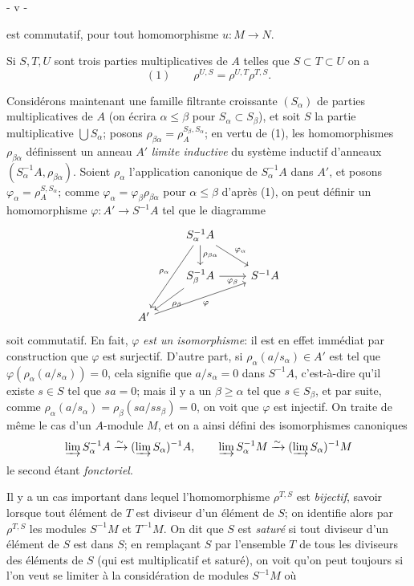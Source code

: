 \begin{center}
- v -
\end{center}

est commutatif, pour tout homomorphisme $u : M \to N$.

Si $S, T, U$ sont trois parties multiplicatives de $A$ telles que $S \subset T \subset U$ on a
$$ (1) \qquad \rho^{U,S} = \rho^{U,T} \rho^{T,S} . $$

Considérons maintenant une famille filtrante croissante $(S_\alpha)$ de parties multiplicatives de $A$ (on écrira $\alpha \leq \beta$ pour $S_\alpha \subset S_\beta$), et soit $S$ la partie multiplicative $\bigcup S_\alpha$; posons $\rho_{\beta\alpha} = \rho_A^{S_\beta, S_\alpha}$; en vertu de (1), les homomorphismes $\rho_{\beta\alpha}$ définissent un anneau $A'$ \emph{limite inductive} du système inductif d'anneaux $(S_\alpha^{-1}A, \rho_{\beta\alpha})$. Soient $\rho_\alpha$ l'application canonique de $S_\alpha^{-1}A$ dans $A'$, et posons $\varphi_\alpha = \rho_A^{S, S_\alpha}$; comme $\varphi_\alpha = \varphi_\beta \rho_{\beta\alpha}$ pour $\alpha \leq \beta$ d'après (1), on peut définir un homomorphisme $\varphi : A' \to S^{-1}A$ tel que le diagramme
$$
\begin{tikzcd}
& S_\alpha^{-1}A \arrow[d, "\rho_{\beta\alpha}"] \arrow[dr, "\varphi_\alpha"] \arrow[ddl, "\rho_\alpha"'] & \\
& S_\beta^{-1}A \arrow[dl, "\rho_\beta"] \arrow[r, "\varphi_\beta"'] & S^{-1}A \\
A' \arrow[urr, "\varphi"'] & & 
\end{tikzcd}
$$
soit commutatif. En fait, $\varphi$ \emph{est un isomorphisme}: il est en effet immédiat par construction que $\varphi$ est surjectif. D'autre part, si $\rho_\alpha(a/s_\alpha) \in A'$ est tel que $\varphi(\rho_\alpha(a/s_\alpha)) = 0$, cela signifie que $a/s_\alpha = 0$ dans $S^{-1}A$, c'est-à-dire qu'il existe $s \in S$ tel que $sa = 0$; mais il y a un $\beta \geq \alpha$ tel que $s \in S_\beta$, et par suite, comme $\rho_\alpha(a/s_\alpha) = \rho_\beta(sa/ss_\beta) = 0$, on voit que $\varphi$ est injectif. On traite de même le cas d'un $A$-module $M$, et on a ainsi défini des isomorphismes canoniques
$$ \varinjlim S_\alpha^{-1}A \xrightarrow{\sim} (\varinjlim S_\alpha)^{-1}A , \qquad \varinjlim S_\alpha^{-1}M \xrightarrow{\sim} (\varinjlim S_\alpha)^{-1}M $$
le second étant \emph{fonctoriel}.

Il y a un cas important dans lequel l'homomorphisme $\rho^{T,S}$ est \emph{bijectif}, savoir lorsque tout élément de $T$ est diviseur d'un élément de $S$; on identifie alors par $\rho^{T,S}$ les modules $S^{-1}M$ et $T^{-1}M$. On dit que $S$ est \emph{saturé} si tout diviseur d'un élément de $S$ est dans $S$; en remplaçant $S$ par l'ensemble $T$ de tous les diviseurs des éléments de $S$ (qui est multiplicatif et saturé), on voit qu'on peut toujours si l'on veut se limiter à la considération de modules $S^{-1}M$ où